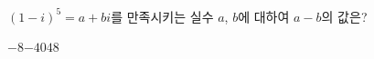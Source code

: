 $(1-i)^5=a+bi$를 만족시키는 실수 $a$, $b$에 대하여 $a-b$의 값은?
\begin{choices32}{$-8$}{$-4$}{$0$}{$4$}{$8$}\end{choices32}
